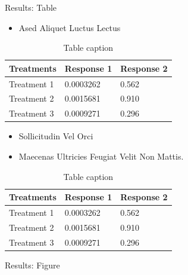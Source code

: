 \documentclass[final,hyperref={pdfpagelabels=false}]{beamer}
\begin{document}
\begin{frame}[t]
\begin{columns}[t]
\begin{column}{.465\textwidth}

\begin{block}{Results: Table}

\begin{itemize}
\item Ased Aliquet Luctus Lectus
\end{itemize}

\begin{table}
\begin{tabular}{l l l}
\toprule
\textbf{Treatments} & \textbf{Response 1} & \textbf{Response 2}\\
\midrule
Treatment 1 & 0.0003262 & 0.562 \\
Treatment 2 & 0.0015681 & 0.910 \\
Treatment 3 & 0.0009271 & 0.296 \\
\bottomrule
\end{tabular}
\caption{Table caption}
\end{table}

\begin{itemize}
\item Sollicitudin Vel Orci
\item Maecenas Ultricies Feugiat Velit Non Mattis.
\end{itemize}

\begin{table}
\begin{tabular}{l l l}
\toprule
\textbf{Treatments} & \textbf{Response 1} & \textbf{Response 2}\\
\midrule
Treatment 1 & 0.0003262 & 0.562 \\
Treatment 2 & 0.0015681 & 0.910 \\
Treatment 3 & 0.0009271 & 0.296 \\
\bottomrule
\end{tabular}
\caption{Table caption}
\end{table}
     
\end{block}


\begin{block}{Results: Figure}


\end{block}
\end{column}
\end{columns}
\end{frame}
\end{document}
